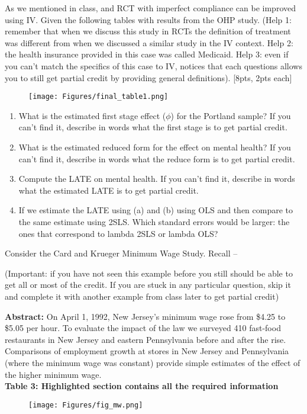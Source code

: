 \item As we mentioned in class, and RCT with imperfect compliance can be improved using IV. Given the following tables with results from the OHP study. 
(Help 1: remember that when we discuss this study in RCTs the definition of treatment was different from when we discussed a similar study in the IV context. Help 2: the health insurance provided in this case was called Medicaid. Help 3: even if you can't match the specifics of this case to IV, notices that each questions allows you to still get partial credit by providing general definitions). [8pts, 2pts each]
 \begin{figure}[H]
    \centering
    \texttt{[image: Figures/final\_table1.png]}
    \label{}
\end{figure}
 \begin{enumerate}[label=\alph*)]
    \item What is the estimated first stage effect ($\phi$) for the Portland sample? If you can’t find it, describe in words what the first stage is to get partial credit. 
    \vspace{2cm}
    \item What is the estimated reduced form for the effect on mental health? If you can’t find it, describe in words what the reduce form is to get partial credit.
    \vspace{2cm}
    \item Compute the LATE on mental health. If you can’t find it, describe in words what the estimated LATE is to get partial credit. 
    \vspace{2cm}
    \item If we estimate the LATE using (a) and (b) using OLS and then compare to the same estimate using 2SLS. Which standard errors would be larger: the ones that correspond to lambda 2SLS or lambda OLS?
    \vspace{2cm}
   \end{enumerate}


\newpage
Consider the Card and Krueger Minimum Wage Study. Recall --   

(Important: if you have not seen this example before you still should be able to get all or most of the credit. If you are stuck in any particular question, skip it and complete it with another example from class later to get partial credit)

\textbf{Abstract:} 
On April 1, 1992, New Jersey's minimum wage rose from \$4.25 to \$5.05 per hour. To evaluate the impact of the law we surveyed 410 fast-food restaurants in New Jersey and eastern Pennsylvania before and after the rise. Comparisons of employment growth at stores in New Jersey and Pennsylvania (where the minimum wage was constant) provide simple estimates of the effect of the higher minimum wage.
\\
\textbf{Table 3: Highlighted section contains all the required information}
 \begin{figure}[H]
    \centering
    \texttt{[image: Figures/fig\_mw.png]}
    \label{}
\end{figure}

